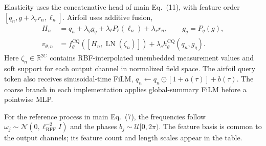 \documentclass[11pt]{article}
\begin{document}
Elasticity uses the concatenative head of main Eq.~(11), with feature order $[q_n,g+\lambda_r r_n,\ell_n]$. Airfoil uses additive fusion,
\begin{align}
 H_n&=q_n+\lambda_g g_q+\lambda_\ell P_\ell(\ell_n)+\lambda_r r_n,
       \qquad g_q=P_q(g),\\
 v_{\theta,n}&=f_\theta^{\mathrm{CQ}}
       ([H_n,\operatorname{LN}(\zeta_n)])
       +\lambda_c h_\theta^{\mathrm{CQ}}(q_n,g_q).
 \label{eq:cq-head}
\end{align}
Here $\zeta_n\in\mathbb R^{2C}$ contains RBF-interpolated unembedded measurement values and soft support for each output channel in normalized field space. The airfoil query token also receives sinusoidal-time FiLM, $q_n\leftarrow q_n\odot[1+a(\tau)]+b(\tau)$. The coarse branch in each implementation applies global-summary FiLM before a pointwise MLP.

For the reference process in main Eq.~(7), the frequencies follow $\omega_j\sim\mathcal N(0,\ell_{\mathrm{RFF}}^{-2}I)$ and the phases $b_j\sim\mathcal U[0,2\pi)$. The feature basis is common to the output channels; its feature count and length scales appear in the table.
\end{document}
